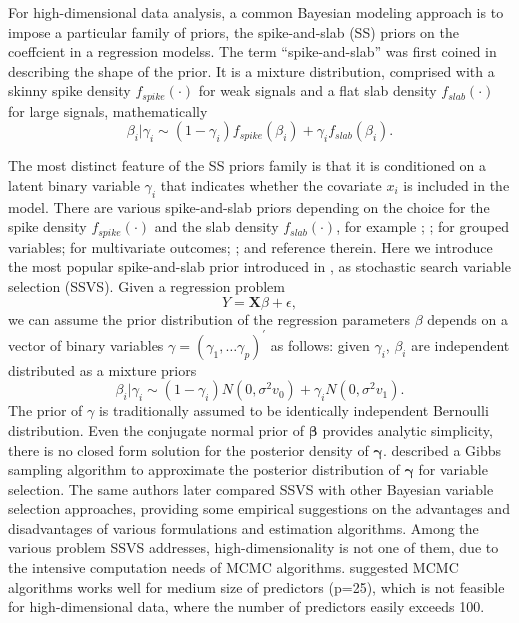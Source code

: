 \documentclass[AMA,STIX1COL,]{WileyNJD-v2}
\begin{document}
For high-dimensional data analysis, a common Bayesian modeling approach
is to impose a particular family of priors, the spike-and-slab (SS)
priors on the coeffcient in a regression modelss. The term
``spike-and-slab'' was first coined in \citet{Mitchell1988} describing
the shape of the prior. It is a mixture distribution, comprised with a
skinny spike density \(f_{spike}(\cdot)\) for weak signals and a flat
slab density \(f_{slab}(\cdot)\) for large signals, mathematically \[
 \beta_i|\gamma_i \sim (1-\gamma_i)f_{spike}(\beta_i) + \gamma_if_{slab}(\beta_i).
\]

The most distinct feature of the SS priors family is that it is
conditioned on a latent binary variable \(\gamma_i\) that indicates
whether the covariate \(x_i\) is included in the model. There are
various spike-and-slab priors depending on the choice for the spike
density \(f_{spike}(\cdot)\) and the slab density \(f_{slab}(\cdot)\),
for example \citet{George1993}; \citet{George1997}; \citet{Chipman1996}
for grouped variables; \citet{Brown1998} for multivariate outcomes;
\citet{Ishwaran2005}; \citet{Clyde2004} and reference therein. Here we
introduce the most popular spike-and-slab prior introduced in
\citet{George1993}, as stochastic search variable selection (SSVS).
Given a regression problem \[
Y = \boldsymbol{X}\beta+\epsilon, 
\] we can assume the prior distribution of the regression parameters
\(\beta\) depends on a vector of binary variables
\(\gamma=(\gamma_1, \dots \gamma_p)^\prime\) as follows: given
\(\gamma_i\), \(\beta_i\) are independent distributed as a mixture
priors \[
\beta_i | \gamma_i \sim (1-\gamma_i)N(0, \sigma^2 v_0) + \gamma_iN(0,\sigma^2 v_1).
\] The prior of \(\gamma\) is traditionally assumed to be identically
independent Bernoulli distribution. Even the conjugate normal prior of
\(\boldsymbol{\beta}\) provides analytic simplicity, there is no closed
form solution for the posterior density of \(\boldsymbol{\gamma}\).
\citet{George1993} described a Gibbs sampling algorithm to approximate
the posterior distribution of \(\boldsymbol{\gamma}\) for variable
selection. The same authors later compared SSVS with other Bayesian
variable selection approaches, providing some empirical suggestions on
the advantages and disadvantages of various formulations and estimation
algorithms. \citep{George1997} Among the various problem SSVS addresses,
high-dimensionality is not one of them, due to the intensive computation
needs of MCMC algorithms. \citet{George1997} suggested MCMC algorithms
works well for medium size of predictors (p=25), which is not feasible
for high-dimensional data, where the number of predictors easily exceeds
100.
\end{document}
